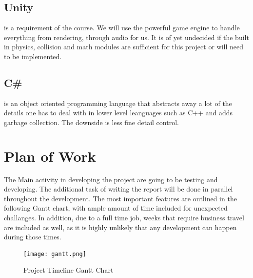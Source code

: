 \documentclass{article}
\begin{document}
\subsection{Unity} is a requirement of the course. We will use the powerful game engine to handle everything from rendering, through audio for us. It is of yet undecided if the built in physics, collision and math modules are sufficient for this project or will need to be implemented.
\subsection{C\#} is an object oriented programming language that abstracts away a lot of the details one has to deal with in lower level leanguages such as C++ and adds garbage collection. The downside is less fine detail control.


\section{Plan of Work}

The Main activity in developing the project are going to be testing and developing. The additional task of writing the report will be done in parallel throughout the development. The most important features are outlined in the following Gantt chart, with ample amount of time included for unexpected challanges.
In addition, due to a full time job, weeks that require business travel are included as well, as it is highly unlikely that any development can happen during those times.
\begin{figure}[H]
    \centering
    \texttt{[image: gantt.png]}
    \caption{Project Timeline Gantt Chart}
    \label{fig:gantt}
\end{figure}
\end{document}
